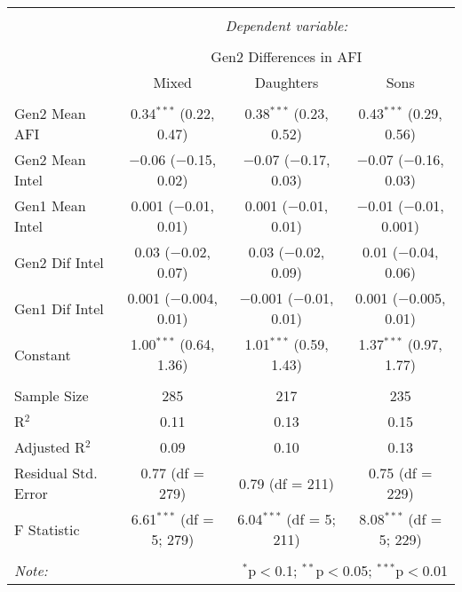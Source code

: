 
\begingroup 
\small 
\begin{tabular}{@{\extracolsep{1pt}}lccc} 
\\[-1.8ex]\hline 
\hline \\[-1.8ex] 
 & \multicolumn{3}{c}{\textit{Dependent variable:}} \\ 
\cline{2-4} 
\\[-1.8ex] & \multicolumn{3}{c}{Gen2 Differences in AFI} \\ 
 & Mixed & Daughters & Sons \\ 
\hline \\[-1.8ex] 
 Gen2 Mean AFI & 0.34$^{***}$ (0.22, 0.47) & 0.38$^{***}$ (0.23, 0.52) & 0.43$^{***}$ (0.29, 0.56) \\ 
  Gen2 Mean Intel & $-$0.06 ($-$0.15, 0.02) & $-$0.07 ($-$0.17, 0.03) & $-$0.07 ($-$0.16, 0.03) \\ 
  Gen1 Mean Intel & 0.001 ($-$0.01, 0.01) & 0.001 ($-$0.01, 0.01) & $-$0.01 ($-$0.01, 0.001) \\ 
  Gen2 Dif Intel & 0.03 ($-$0.02, 0.07) & 0.03 ($-$0.02, 0.09) & 0.01 ($-$0.04, 0.06) \\ 
  Gen1 Dif Intel & 0.001 ($-$0.004, 0.01) & $-$0.001 ($-$0.01, 0.01) & 0.001 ($-$0.005, 0.01) \\ 
  Constant & 1.00$^{***}$ (0.64, 1.36) & 1.01$^{***}$ (0.59, 1.43) & 1.37$^{***}$ (0.97, 1.77) \\ 
 \hline \\[-1.8ex] 
Sample Size & 285 & 217 & 235 \\ 
R$^{2}$ & 0.11 & 0.13 & 0.15 \\ 
Adjusted R$^{2}$ & 0.09 & 0.10 & 0.13 \\ 
Residual Std. Error & 0.77 (df = 279) & 0.79 (df = 211) & 0.75 (df = 229) \\ 
F Statistic & 6.61$^{***}$ (df = 5; 279) & 6.04$^{***}$ (df = 5; 211) & 8.08$^{***}$ (df = 5; 229) \\ 
\hline 
\hline \\[-1.8ex] 
\textit{Note:}  & \multicolumn{3}{r}{$^{*}$p$<$0.1; $^{**}$p$<$0.05; $^{***}$p$<$0.01} \\ 
\end{tabular} 
\endgroup 

